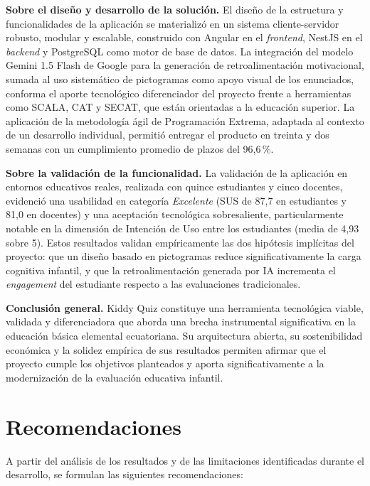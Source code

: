 \textbf{Sobre el diseño y desarrollo de la solución.} El diseño de la estructura y funcionalidades de la aplicación se materializó en un sistema cliente-servidor robusto, modular y escalable, construido con Angular en el \textit{frontend}, NestJS en el \textit{backend} y PostgreSQL como motor de base de datos. La integración del modelo Gemini 1.5 Flash de Google para la generación de retroalimentación motivacional, sumada al uso sistemático de pictogramas como apoyo visual de los enunciados, conforma el aporte tecnológico diferenciador del proyecto frente a herramientas como SCALA, CAT y SECAT, que están orientadas a la educación superior. La aplicación de la metodología ágil de Programación Extrema, adaptada al contexto de un desarrollo individual, permitió entregar el producto en treinta y dos semanas con un cumplimiento promedio de plazos del 96,6\,\%.

\textbf{Sobre la validación de la funcionalidad.} La validación de la aplicación en entornos educativos reales, realizada con quince estudiantes y cinco docentes, evidenció una usabilidad en categoría \textit{Excelente} (SUS de 87,7 en estudiantes y 81,0 en docentes) y una aceptación tecnológica sobresaliente, particularmente notable en la dimensión de Intención de Uso entre los estudiantes (media de 4,93 sobre 5). Estos resultados validan empíricamente las dos hipótesis implícitas del proyecto: que un diseño basado en pictogramas reduce significativamente la carga cognitiva infantil, y que la retroalimentación generada por IA incrementa el \textit{engagement} del estudiante respecto a las evaluaciones tradicionales.

\textbf{Conclusión general.} Kiddy Quiz constituye una herramienta tecnológica viable, validada y diferenciadora que aborda una brecha instrumental significativa en la educación básica elemental ecuatoriana. Su arquitectura abierta, su sostenibilidad económica y la solidez empírica de sus resultados permiten afirmar que el proyecto cumple los objetivos planteados y aporta significativamente a la modernización de la evaluación educativa infantil.

\section{Recomendaciones}

A partir del análisis de los resultados y de las limitaciones identificadas durante el desarrollo, se formulan las siguientes recomendaciones:

